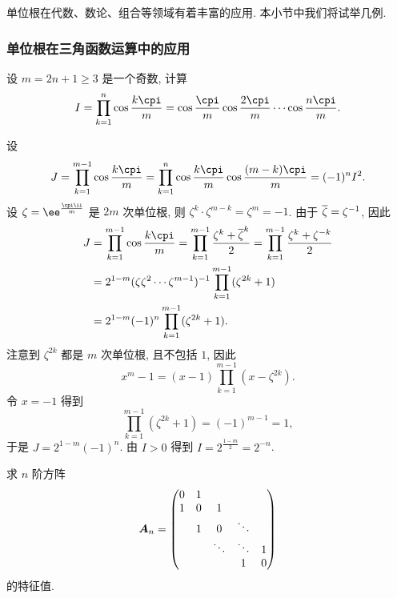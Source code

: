 单位根在代数、数论、组合等领域有着丰富的应用.
本小节中我们将试举几例.


\subsubsection{单位根在三角函数运算中的应用}

\begin{example}
  设 $m=2n+1\ge 3$ 是一个奇数, 计算
  \[
    I=\prod_{k=1}^n\cos\frac{k\cpi}m
    =\cos\frac{\cpi}m \cos\frac{2\cpi}m \cdots \cos\frac{n\cpi}m.
  \]
\end{example}

\begin{solution}
  设
  \[
     J
    =\prod_{k=1}^{m-1}\cos\frac{k\cpi}m
    =\prod_{k=1}^n\cos\frac{k\cpi}m\cos\frac{(m-k)\cpi}m
    =(-1)^n I^2.
  \]
  设 $\zeta=\ee^{\frac{\cpi\ii}m}$ 是 $2m$ 次单位根, 则 $\zeta^k\cdot\zeta^{m-k}=\zeta^m=-1$.
  由于 $\overline\zeta=\zeta^{-1}$, 因此
  \begin{align*}
     J&
    =\prod_{k=1}^{m-1}\cos\frac{k\cpi}m
    =\prod_{k=1}^{m-1}\frac{\zeta^k+{\ov\zeta}^k}2
    =\prod_{k=1}^{m-1}\frac{\zeta^k+\zeta^{-k}}2\\&
    =2^{1-m}(\zeta\zeta^2\cdots\zeta^{m-1})^{-1}
      \prod_{k=1}^{m-1}(\zeta^{2k}+1)\\&
    =2^{1-m}(-1)^n
      \prod_{k=1}^{m-1}(\zeta^{2k}+1).
  \end{align*}
  注意到 $\zeta^{2k}$ 都是 $m$ 次单位根, 且不包括 $1$, 因此
  \[
    x^m-1=(x-1)\prod_{k=1}^{m-1}(x-\zeta^{2k}).
  \]
  令 $x=-1$ 得到
  \[
    \prod_{k=1}^{m-1}(\zeta^{2k}+1)=(-1)^{m-1}=1,
  \]
  于是 $J=2^{1-m}(-1)^n$.
  由 $I>0$ 得到 $I=2^{\frac{1-m}2}=2^{-n}$.
\end{solution}

\begin{example}
  求 $n$ 阶方阵
  \[
    {\boldsymbol{A}}_n=\begin{pmatrix}
      0&1&&&\\
      1&0&1&&\\
      &1&0&\ddots&\\
      &&\ddots&\ddots &1\\
      &&&1&0
    \end{pmatrix}
  \]
  的特征值.
\end{example}

